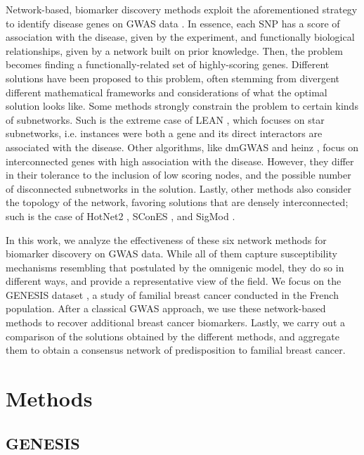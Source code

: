 \documentclass[twocolumn, 11pt, draft]{article}
\begin{document}
Network-based, biomarker discovery methods exploit the aforementioned strategy to identify disease genes on GWAS data \cite{azencott_network-guided_2016}. In essence, each SNP has a score of association with the disease, given by the experiment, and functionally biological relationships, given by a network built on prior knowledge. Then, the problem becomes finding a functionally-related set of highly-scoring genes. Different solutions have been proposed to this problem, often stemming from divergent different mathematical frameworks and considerations of what the optimal solution looks like. Some methods strongly constrain the problem to certain kinds of subnetworks. Such is the extreme case of LEAN \cite{gwinner_network-based_2016}, which focuses on star subnetworks, i.e. instances were both a gene and its direct interactors are associated with the disease. Other algorithms, like dmGWAS \cite{jia_dmgwas:_2011} and heinz \cite{dittrich_identifying_2008}, focus on interconnected genes with high association with the disease. However, they differ in their tolerance to the inclusion of low scoring nodes, and the possible number of disconnected subnetworks in the solution. Lastly, other methods also consider the topology of the network, favoring solutions that are densely interconnected; such is the case of HotNet2 \cite{leiserson_pan-cancer_2015}, SConES \cite{azencott_efficient_2013}, and SigMod \cite{liu_sigmod:_2017}.

In this work, we analyze the effectiveness of these six network methods for biomarker discovery on GWAS data. While all of them capture susceptibility mechanisms resembling that postulated by the omnigenic model, they do so in different ways, and provide a representative view of the field. We focus on the GENESIS dataset \cite{sinilnikova_genesis:_2016}, a study of familial breast cancer conducted in the French population. After a classical GWAS approach, we use these network-based methods to recover additional breast cancer biomarkers. Lastly, we carry out a comparison of the solutions obtained by the different methods, and aggregate them to obtain a consensus network of predisposition to familial breast cancer. 

\section{Methods}
\subsection{GENESIS}
\end{document}
